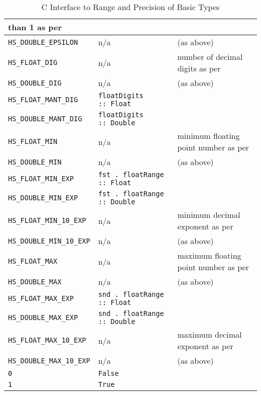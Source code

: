 \documentclass[a4paper,twosides]{article}
\newcommand{\code}[1]{\texttt{#1}}      %
\begin{document}
\begin{table}
\begin{center}
\begin{tabular}{|l|l|p{30ex}|}
      than 1 as per~\cite{C99}\\
      \hline
      \code{HS\_DOUBLE\_EPSILON} & n/a
      & (as above)\\
      \hline
      \code{HS\_FLOAT\_DIG} & n/a
      & number of decimal digits as per~\cite{C99}\\
      \hline
      \code{HS\_DOUBLE\_DIG} & n/a
      & (as above)\\
      \hline
      \code{HS\_FLOAT\_MANT\_DIG} & \code{floatDigits ::\ Float}
      & \\
      \hline
      \code{HS\_DOUBLE\_MANT\_DIG} & \code{floatDigits ::\ Double}
      & \\
      \hline
      \code{HS\_FLOAT\_MIN} & n/a
      & minimum floating point number as per~\cite{C99}\\
      \hline
      \code{HS\_DOUBLE\_MIN} & n/a
      & (as above)\\
      \hline
      \code{HS\_FLOAT\_MIN\_EXP} & \code{fst .\ floatRange ::\ Float}
      & \\
      \hline
      \code{HS\_DOUBLE\_MIN\_EXP} & \code{fst .\ floatRange ::\ Double}
      & \\
      \hline
      \code{HS\_FLOAT\_MIN\_10\_EXP} & n/a
      & minimum decimal exponent as per~\cite{C99}\\
      \hline
      \code{HS\_DOUBLE\_MIN\_10\_EXP} & n/a
      & (as above)\\
      \hline
      \code{HS\_FLOAT\_MAX} & n/a
      & maximum floating point number as per~\cite{C99}\\
      \hline
      \code{HS\_DOUBLE\_MAX} & n/a
      & (as above)\\
      \hline
      \code{HS\_FLOAT\_MAX\_EXP} & \code{snd .\ floatRange ::\ Float}
      & \\
      \hline
      \code{HS\_DOUBLE\_MAX\_EXP} & \code{snd .\ floatRange ::\ Double}
      & \\
      \hline
      \code{HS\_FLOAT\_MAX\_10\_EXP} & n/a
      & maximum decimal exponent as per~\cite{C99}\\
      \hline
      \code{HS\_DOUBLE\_MAX\_10\_EXP} & n/a
      & (as above)\\
      \hline
      \code{0} & \code{False}
      & \\
      \hline
      \code{1} & \code{True}
      & \\
      \hline
    \end{tabular}
    \caption{C Interface to Range and Precision of Basic Types}
    \label{tab:c-haskell-values}
  \end{center}
\end{table}
\end{document}

